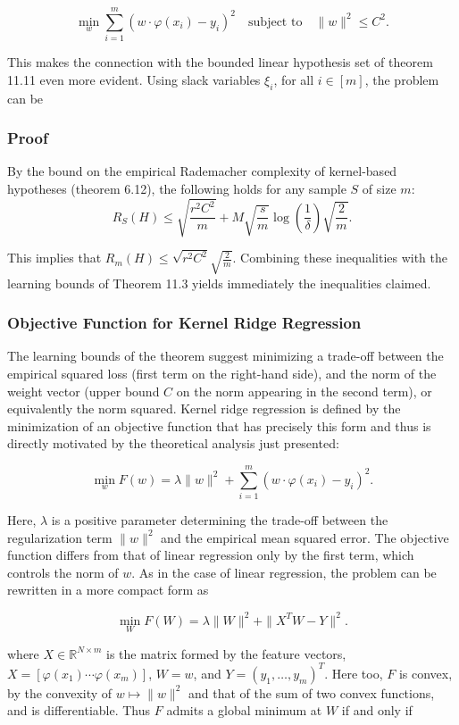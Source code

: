 \documentclass[fleqn,10pt]{olplainarticle}
\begin{document}
\[
\min_w \sum_{i=1}^{m} (w \cdot \varphi(x_i) - y_i)^2 \quad \text{subject to} \quad \|w\|^2 \leq C^2. \tag{11.15}
\]

This makes the connection with the bounded linear hypothesis set of theorem 11.11 even more evident. Using slack variables $\xi_i$, for all $i \in [m]$, the problem can be

\subsubsection{Proof}

By the bound on the empirical Rademacher complexity of kernel-based hypotheses (theorem 6.12), the following holds for any sample $S$ of size $m$:
\[
\hat{R}_S(H) \leq \sqrt{\frac{r^2C^2}{m}} + M \sqrt{\frac{s}{m}} \log\left(\frac{1}{\delta}\right) \sqrt{\frac{2}{m}}.
\]

This implies that $R_m(H) \leq \sqrt{r^2C^2} \sqrt{\frac{2}{m}}$. Combining these inequalities with the learning bounds of Theorem 11.3 yields immediately the inequalities claimed.

\subsubsection{Objective Function for Kernel Ridge Regression}

The learning bounds of the theorem suggest minimizing a trade-off between the empirical squared loss (first term on the right-hand side), and the norm of the weight vector (upper bound $C$ on the norm appearing in the second term), or equivalently the norm squared. Kernel ridge regression is defined by the minimization of an objective function that has precisely this form and thus is directly motivated by the theoretical analysis just presented:

\[
\min_w F(w) = \lambda \|w\|^2 + \sum_{i=1}^{m} (w \cdot \varphi(x_i) - y_i)^2. \tag{11.12}
\]

Here, $\lambda$ is a positive parameter determining the trade-off between the regularization term $\|w\|^2$ and the empirical mean squared error. The objective function differs from that of linear regression only by the first term, which controls the norm of $w$. As in the case of linear regression, the problem can be rewritten in a more compact form as

\[
\min_W F(W) = \lambda \|W\|^2 + \|X^TW - Y\|^2. \tag{11.13}
\]

where $X \in \mathbb{R}^{N \times m}$ is the matrix formed by the feature vectors, $X = [\varphi(x_1) \cdots \varphi(x_m)]$, $W = w$, and $Y = (y_1, \ldots, y_m)^T$. Here too, $F$ is convex, by the convexity of $w \mapsto \|w\|^2$ and that of the sum of two convex functions, and is differentiable. Thus $F$ admits a global minimum at $W$ if and only if
\end{document}

